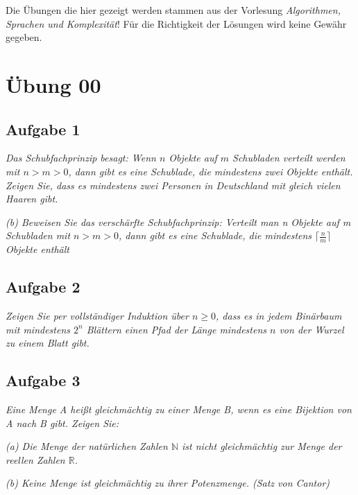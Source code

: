 \documentclass[a4paper]{article}
\begin{document}
\begin{myboxii}[Disclaimer]
    Die Übungen die hier gezeigt werden stammen aus der Vorlesung \textit{Algorithmen, Sprachen und Komplexität}! Für die Richtigkeit der Lösungen wird keine Gewähr gegeben.
\end{myboxii}


\section{Übung 00}
\subsection{Aufgabe 1}
\textit{Das Schubfachprinzip besagt: Wenn $n$ Objekte auf $m$ Schubladen verteilt werden mit $n > m > 0$, dann gibt es eine Schublade, die mindestens zwei Objekte enthält.}
\textit{Zeigen Sie, dass es mindestens zwei Personen in Deutschland mit gleich vielen Haaren gibt.}

\textit{(b) Beweisen Sie das verschärfte Schubfachprinzip: Verteilt man n Objekte auf m Schubladen mit $n > m > 0$, dann gibt es eine Schublade, die mindestens $\lceil \frac{n}{m}\rceil$ Objekte enthält}

\subsection{Aufgabe 2}
\textit{Zeigen Sie per vollständiger Induktion über $n\geq 0$, dass es in jedem Binärbaum mit mindestens $2^n$ Blättern einen Pfad der Länge mindestens $n$ von der Wurzel zu einem Blatt gibt.}

\subsection{Aufgabe 3}
\textit{Eine Menge A heißt gleichmächtig zu einer Menge B, wenn es eine Bijektion von A nach B gibt. Zeigen Sie:}

\textit{(a) Die Menge der natürlichen Zahlen $\mathbb{N}$ ist nicht gleichmächtig zur Menge der reellen Zahlen $\mathbb{R}$.}

\textit{(b) Keine Menge ist gleichmächtig zu ihrer Potenzmenge. (Satz von Cantor)}

\newpage
\end{document}
